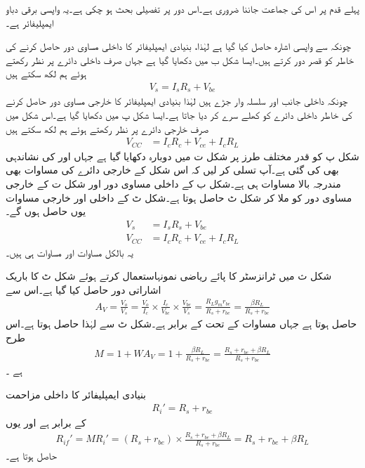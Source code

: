 پہلے قدم پر اس کی جماعت جاننا ضروری ہے۔اس دور پر تفصیلی بحث ہو چکی ہے۔یہ واپسی برقی دباو ایمپلیفائر ہے۔

چونکہ  سے واپسی اشارہ حاصل کیا گیا ہے لہٰذا، بنیادی ایمپلیفائر کا داخلی مساوی دور حاصل کرنے کی خاطر  کو قصر دور کرتے ہیں۔ایسا شکل  ب میں دکھایا گیا ہے جہاں صرف داخلی دائرے پر نظر رکھتے ہوئے ہم لکھ سکتے ہیں
\begin{align} \label{مساوات_واپسی_برقی_دباو_داخلی_مساوی}
V_s = I_s R_s +V_{be}
\end{align}
چونکہ داخلی جانب  اور  سلسلہ وار جڑے ہیں لہٰذا بنیادی ایمپلیفائر کا خارجی مساوی دور حاصل کرنے کی خاطر داخلی دائرے کو کھلے سرے کر دیا جاتا ہے۔ایسا شکل  پ میں دکھایا گیا ہے۔اس شکل میں صرف خارجی دائرے پر نظر رکھتے ہوئے ہم لکھ سکتے ہیں
\begin{align} \label{مساوات_واپسی_برقی_دباو_خارجی_مساوی}
V_{CC} &= I_c R_c+V_{ce}+I_c R_L 
\end{align}
شکل  پ کو قدر مختلف طرز پر شکل  ت میں دوبارہ دکھایا گیا ہے جہاں  اور  کی نشاندہی بھی کی گئی ہے۔آپ تسلی کر لیں کہ اس شکل کے 
خارجی دائرے کی مساوات  بھی مندرجہ بالا مساوات ہی ہے۔شکل  ب کے داخلی مساوی دور اور شکل  ت کے خارجی مساوی دور کو ملا کر شکل  ٹ حاصل ہوتا ہے۔شکل  ٹ کے داخلی اور خارجی مساوات یوں حاصل ہوں گے۔
\begin{align}
V_s &= I_s R_s +V_{be}\\
V_{CC} &= I_c R_c+V_{ce}+I_c R_L
\end{align}
یہ بالکل مساوات  اور مساوات  ہی ہیں۔

شکل  ث میں ٹرانزسٹر کا پائے ریاضی نمونہاستعمال کرتے ہوئے شکل  ٹ کا باریک اشاراتی دور حاصل کیا گیا ہے۔اس سے
\begin{align} \label{مساوات_واپسی_ٹرانزسٹر_تابع_مخارج_افزائش}
A_V=\frac{V_o}{V_s}=\frac{V_o}{I_c} \times \frac{I_c}{V_{be}} \times \frac{V_{be}}{V_s}=\frac{R_L g_m r_{be}}{R_s+r_{be}}=\frac{\beta R_L}{R_s+r_{be}}
\end{align}
حاصل ہوتا ہے جہاں مساوات  کے تحت  کے برابر ہے۔شکل  ٹ سے    لہٰذا  حاصل ہوتا ہے۔اس طرح
\begin{align}
M=1+W A_V=1+\frac{\beta R_L}{R_s+r_{be}}=\frac{R_s+r_{be}+\beta R_L}{R_s+r_{be}}
\end{align}
ہے ۔

بنیادی ایمپلیفائر کا داخلی مزاحمت
\begin{align}
R_i'=R_s+r_{be}
\end{align}
کے برابر ہے اور یوں
\begin{align}
R_{if}'=M R_i' =\left (R_s+r_{be} \right) \times \frac{R_s+r_{be}+\beta R_L}{R_s+r_{be}}=R_s+r_{be}+\beta R_L
\end{align}
حاصل ہوتا ہے۔

